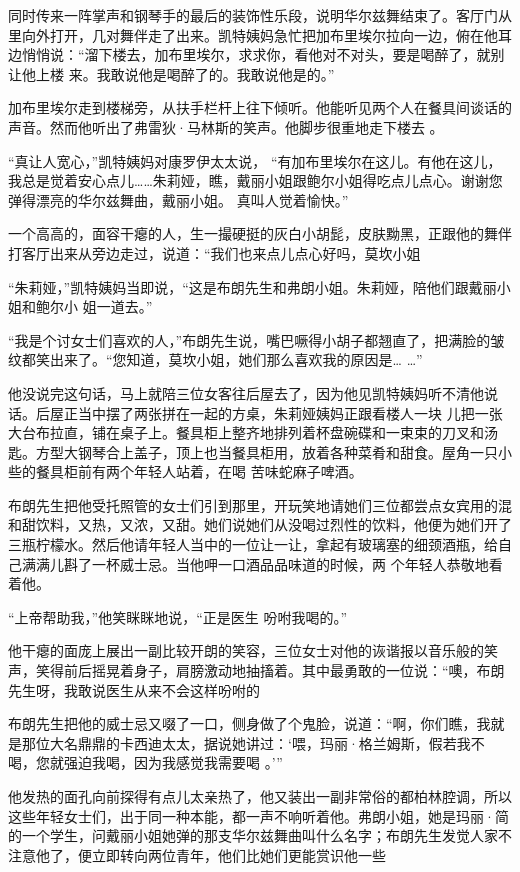 \documentclass{article}
\begin{document}
同时传来一阵掌声和钢琴手的最后的装饰性乐段，说明华尔兹舞结束了。客厅门从里向外打开，几对舞伴走了出来。凯特姨妈急忙把加布里埃尔拉向一边，俯在他耳边悄悄说：“溜下楼去，加布里埃尔，求求你，看他对不对头，要是喝醉了，就别让他上楼
来。我敢说他是喝醉了的。我敢说他是的。” 

加布里埃尔走到楼梯旁，从扶手栏杆上往下倾听。他能听见两个人在餐具间谈话的声音。然而他听出了弗雷狄·马林斯的笑声。他脚步很重地走下楼去
。 

“真让人宽心，”凯特姨妈对康罗伊太太说，
\newpage
“有加布里埃尔在这儿。有他在这儿，我总是觉着安心点儿……朱莉娅，瞧，戴丽小姐跟鲍尔小姐得吃点儿点心。谢谢您弹得漂亮的华尔兹舞曲，戴丽小姐。
真叫人觉着愉快。” 

一个高高的，面容干瘪的人，生一撮硬挺的灰白小胡髭，皮肤黝黑，正跟他的舞伴打客厅出来从旁边走过，说道：“我们也来点儿点心好吗，莫坎小姐

“朱莉娅，”凯特姨妈当即说，“这是布朗先生和弗朗小姐。朱莉娅，陪他们跟戴丽小姐和鲍尔小
姐一道去。” 

“我是个讨女士们喜欢的人，”布朗先生说，嘴巴噘得小胡子都翘直了，把满脸的皱纹都笑出来了。“您知道，莫坎小姐，她们那么喜欢我的原因是…
…” 

他没说完这句话，马上就陪三位女客往后屋去了，因为他见凯特姨妈听不清他说话。后屋正当中摆了两张拼在一起的方桌，朱莉娅姨妈正跟看楼人一块
\newpage
儿把一张大台布拉直，铺在桌子上。餐具柜上整齐地排列着杯盘碗碟和一束束的刀叉和汤匙。方型大钢琴合上盖子，顶上也当餐具柜用，放着各种菜肴和甜食。屋角一只小些的餐具柜前有两个年轻人站着，在喝
苦味蛇麻子啤酒。 

布朗先生把他受托照管的女士们引到那里，开玩笑地请她们三位都尝点女宾用的混和甜饮料，又热，又浓，又甜。她们说她们从没喝过烈性的饮料，他便为她们开了三瓶柠檬水。然后他请年轻人当中的一位让一让，拿起有玻璃塞的细颈酒瓶，给自己满满儿斟了一杯威士忌。当他呷一口酒品品味道的时候，两
个年轻人恭敬地看着他。 

“上帝帮助我，”他笑眯眯地说，“正是医生
吩咐我喝的。” 

他干瘪的面庞上展出一副比较开朗的笑容，三位女士对他的诙谐报以音乐般的笑声，笑得前后摇晃着身子，肩膀激动地抽搐着。其中最勇敢的一位说：“噢，布朗先生呀，我敢说医生从来不会这样吩咐的
\newpage


布朗先生把他的威士忌又啜了一口，侧身做了个鬼脸，说道：“啊，你们瞧，我就是那位大名鼎鼎的卡西迪太太，据说她讲过：‘喂，玛丽·格兰姆斯，假若我不喝，您就强迫我喝，因为我感觉我需要喝
。’” 

他发热的面孔向前探得有点儿太亲热了，他又装出一副非常俗的都柏林腔调，所以这些年轻女士们，出于同一种本能，都一声不响听着他。弗朗小姐，她是玛丽·简的一个学生，问戴丽小姐她弹的那支华尔兹舞曲叫什么名字；布朗先生发觉人家不注意他了，便立即转向两位青年，他们比她们更能赏识他一些
\end{document}
